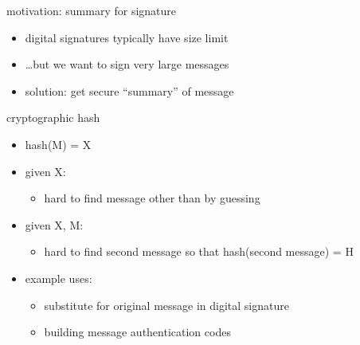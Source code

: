 \begin{frame}{motivation: summary for signature}
    \begin{itemize}
    \item digital signatures typically have size limit
    \item \ldots but we want to sign very large messages
    \vspace{.5cm}
    \item solution: get secure ``summary'' of message
    \end{itemize}
\end{frame}

\begin{frame}{cryptographic hash}
    \begin{itemize}
    \item hash(M) = X
    \vspace{.5cm}
    \item given X:
        \begin{itemize}
        \item hard to find message other than by guessing
        \end{itemize}
    \item given X, M:
        \begin{itemize}
        \item hard to find second message so that hash(second message) = H
        \end{itemize}
    \vspace{.5cm}
    \item example uses:
        \begin{itemize}
        \item substitute for original message in digital signature
        \item building message authentication codes
        \end{itemize}
    \end{itemize}
\end{frame}

